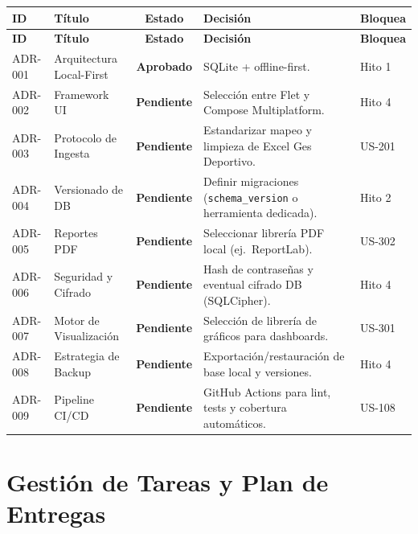 \documentclass[11pt,a4paper]{article}
\newcommand{\fpath}[1]{\texttt{\small #1}}
\begin{document}
\begin{longtable}{>{\small}l >{\small}p{3.5cm} >{\small}c >{\small}p{5cm} >{\small}l}
\toprule
\rowcolor{headergray}
\textbf{ID} & \textbf{Título} & \textbf{Estado} & \textbf{Decisión} & \textbf{Bloquea} \\
\midrule
\endfirsthead
\toprule
\rowcolor{headergray}
\textbf{ID} & \textbf{Título} & \textbf{Estado} & \textbf{Decisión} & \textbf{Bloquea} \\
\midrule
\endhead
ADR-001 & Arquitectura Local-First   & \textcolor{successgreen}{\textbf{Aprobado}} & SQLite + offline-first. & Hito 1 \\
\rowcolor{headergray}
ADR-002 & Framework UI               & \textcolor{warnorange}{\textbf{Pendiente}} & Selección entre Flet y Compose Multiplatform. & Hito 4 \\
ADR-003 & Protocolo de Ingesta       & \textcolor{warnorange}{\textbf{Pendiente}} & Estandarizar mapeo y limpieza de Excel Ges Deportivo. & US-201 \\
\rowcolor{headergray}
ADR-004 & Versionado de DB           & \textcolor{warnorange}{\textbf{Pendiente}} & Definir migraciones (\fpath{schema\_version} o herramienta dedicada). & Hito 2 \\
ADR-005 & Reportes PDF               & \textcolor{warnorange}{\textbf{Pendiente}} & Seleccionar librería PDF local (ej.\ ReportLab). & US-302 \\
\rowcolor{headergray}
ADR-006 & Seguridad y Cifrado        & \textcolor{warnorange}{\textbf{Pendiente}} & Hash de contraseñas y eventual cifrado DB (SQLCipher). & Hito 4 \\
ADR-007 & Motor de Visualización     & \textcolor{warnorange}{\textbf{Pendiente}} & Selección de librería de gráficos para dashboards. & US-301 \\
\rowcolor{headergray}
ADR-008 & Estrategia de Backup       & \textcolor{warnorange}{\textbf{Pendiente}} & Exportación/restauración de base local y versiones. & Hito 4 \\
ADR-009 & Pipeline CI/CD             & \textcolor{warnorange}{\textbf{Pendiente}} & GitHub Actions para lint, tests y cobertura automáticos. & US-108 \\
\bottomrule
\end{longtable}

\section{Gestión de Tareas y Plan de Entregas}
\end{document}
